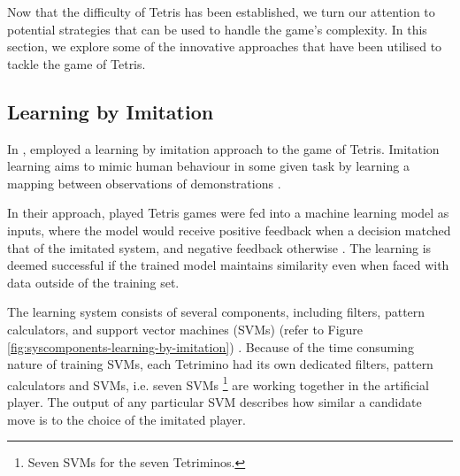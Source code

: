 \documentclass[a4paper, 12pt]{extreport}
\begin{document}
			
			Now that the difficulty of Tetris has been established, we turn our attention to potential strategies that can be used to handle the game's complexity. In this section, we explore some of the innovative approaches that have been utilised to tackle the game of Tetris.
			
			\subsection{Learning by Imitation}
			
				In \citeyear{tetris-learning-by-imitation}, \citeauthor{tetris-learning-by-imitation} \cite{tetris-learning-by-imitation} employed a learning by imitation approach to the game of Tetris. Imitation learning aims to mimic human behaviour in some given task by learning a mapping between observations of demonstrations \cite{imitation-learning}.
				
				In their approach, played Tetris games were fed into a machine learning model as inputs, where the model would receive positive feedback when a decision matched that of the imitated system, and negative feedback otherwise \cite{tetris-learning-by-imitation}. The learning is deemed successful if the trained model maintains similarity even when faced with data outside of the training set.
				
				The learning system consists of several components, including filters, pattern calculators, and support vector machines (SVMs) (refer to Figure \ref{fig:syscomponents-learning-by-imitation}) \cite{tetris-learning-by-imitation}. Because of the time consuming nature of training SVMs, each Tetrimino had its own dedicated filters, pattern calculators and SVMs, i.e. seven SVMs \footnote{Seven SVMs for the seven Tetriminos.} are working together in the artificial player. The output of any particular SVM describes how similar a candidate move is to the choice of the imitated player.
				
\end{document}
